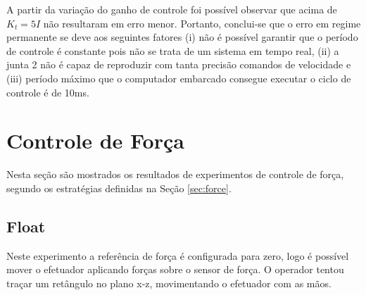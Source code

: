 A partir da variação do ganho de controle foi possível observar que acima de ${K}_t = 5 {I}$ não resultaram em erro menor. Portanto, conclui-se que o erro em regime permanente se deve aos seguintes fatores (i) não é possível garantir que o período de controle é constante pois não se trata de um sistema em tempo real, (ii) a junta 2 não é capaz de reproduzir com tanta precisão comandos de velocidade e (iii) período máximo que o computador embarcado consegue executar o ciclo de controle é de 10ms.

 
\section{Controle de Força}

Nesta seção são mostrados os resultados de experimentos de controle de força, segundo os estratégias definidas na Seção \ref{sec:force}. 

\subsection{Float}
Neste experimento a referência de força é configurada para zero, logo é possível mover o efetuador aplicando forças sobre o  sensor de força. O operador tentou traçar um retângulo no plano x-z, movimentando o efetuador com as mãos.

